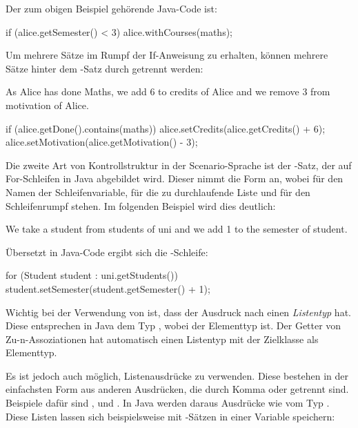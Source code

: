Der zum obigen Beispiel gehörende Java-Code ist:

\begin{jcodeblock}
    if (alice.getSemester() < 3) {
        alice.withCourses(maths);
    }
\end{jcodeblock}

Um mehrere Sätze im Rumpf der If-Anweisung zu erhalten, können mehrere Sätze hinter dem -Satz durch  getrennt werden:

\begin{codeblock}
    As Alice has done Maths, we add 6 to credits of Alice
    and we remove 3 from motivation of Alice.
\end{codeblock}

\begin{jcodeblock}
    if (alice.getDone().contains(maths)) {
        alice.setCredits(alice.getCredits() + 6);
        alice.setMotivation(alice.getMotivation() - 3);
    }
\end{jcodeblock}

Die zweite Art von Kontrollstruktur in der Scenario-Sprache ist der -Satz, der auf For-Schleifen in Java abgebildet wird.
Dieser nimmt die Form  an, wobei  für den Namen der Schleifenvariable,  für die zu durchlaufende Liste und  für den Schleifenrumpf stehen.
Im folgenden Beispiel wird dies deutlich:

\begin{codeblock}
    We take a student from students of uni and we add 1 to the semester of student.
\end{codeblock}

Übersetzt in Java-Code ergibt sich die -Schleife:

\begin{jcodeblock}
    for (Student student : uni.getStudents()) {
        student.setSemester(student.getSemester() + 1);
    }
\end{jcodeblock}

Wichtig bei der Verwendung von  ist, dass der Ausdruck nach  einen \emph{Listentyp} hat.
Diese entsprechen in Java dem Typ , wobei  der Elementtyp ist.
Der Getter von Zu-n-Assoziationen hat automatisch einen Listentyp mit der Zielklasse als Elementtyp.

Es ist jedoch auch möglich, Listenausdrücke zu verwenden.
Diese bestehen in der einfachsten Form aus anderen Ausdrücken, die durch Komma oder  getrennt sind.
Beispiele dafür sind ,  und .
In Java werden daraus Ausdrücke wie  vom Typ .
Diese Listen lassen sich beispielsweise mit -Sätzen in einer Variable speichern:

